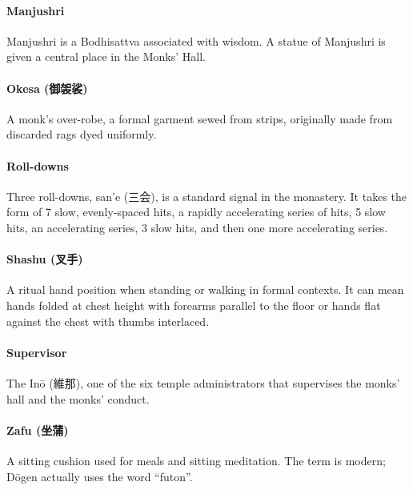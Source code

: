 \documentclass{article}
\begin{document}
\begin{multicols}{2}
\paragraph{Manjushri}

Manjushri is a Bodhisattva associated with wisdom. A statue of
Manjushri is given a central place in the Monks' Hall.

\paragraph{Okesa (御袈裟)}

A monk's over-robe, a formal garment sewed from strips, originally
made from discarded rags dyed uniformly.

\paragraph{Roll-downs}

Three roll-downs, san'e (三会), is a standard signal in the monastery.
It takes the form of 7 slow, evenly-spaced hits, a rapidly
accelerating series of hits, 5 slow hits, an accelerating series,
3 slow hits, and then one more accelerating series.

\paragraph{Shashu (叉手)}

A ritual hand position when standing or walking in formal contexts.
It can mean hands folded at chest height with forearms parallel to the
floor or hands flat against the chest with thumbs interlaced.

\paragraph{Supervisor}

The In\=o (維那), one of the six temple administrators that supervises
the monks' hall and the monks' conduct.

\paragraph{Zafu (坐蒲)}

A sitting cushion used for meals and sitting meditation. The term
is modern; D\=ogen actually uses the word ``futon''.

\vfill

\begin{center}


\end{center}
\end{multicols}
\end{document}

